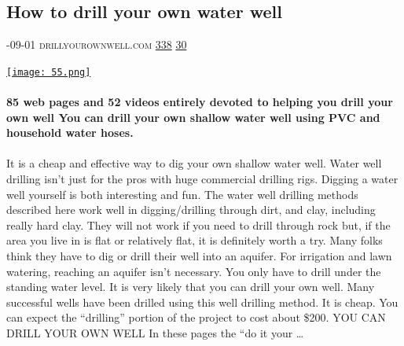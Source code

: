 \documentclass[10pt,a4paper]{article}
\begin{document}
\begin{multicols}{2}
\begin{minipage}{\linewidth}
\subsection{How to drill your own water well}
\textsc{\footnotesize
{\scriptsize\faCalendar}-09-01 
{\scriptsize\faGlobe}\space 
drillyourownwell.com 
{\scriptsize\faThumbsOUp}\space 
\href{http://news.ycombinator.com/item?id=37257514\&utm\_term=comment}{338} 
{\scriptsize\faComments}\space 
\href{http://news.ycombinator.com/item?id=37257514\&utm\_term=comment}{30} 
}
\par\medskip\noindent
\href{https://drillyourownwell.com/?utm\_source=hackernewsletter\&utm\_medium=email\&utm\_term=learn}{
    \texttt{[image: 55.png]}
}
\end{minipage}
\paragraph{}
\textbf{85 web pages and 52 videos entirely devoted
to helping you drill your own well
You can drill your own shallow water well using PVC and household water hoses.}
\paragraph{}
 It is a cheap and effective way to dig your own shallow water well. Water well drilling isn’t just for the pros with huge commercial drilling rigs. Digging a water well yourself is both interesting and fun.
The water well drilling methods described here work well in digging/drilling through dirt, and clay, including really hard clay. They will not work if you need to drill through rock but, if the area you live in is flat or relatively flat, it is definitely worth a try. Many folks think they have to dig or drill their well into an aquifer. For irrigation and lawn watering, reaching an aquifer isn’t necessary. You only have to drill under the standing water level. It is very likely that you can drill your own well. Many successful wells have been drilled using this well drilling method. It is cheap. You can expect the “drilling” portion of the project to cost about \$200.
YOU CAN DRILL YOUR OWN WELL
In these pages the “do it your
\dots\par
\noindent\begin{minipage}{\linewidth}
\medskip

\end{minipage}
\end{multicols}
\end{document}
